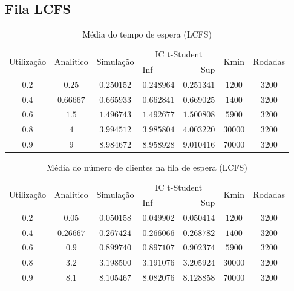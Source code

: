 \documentclass[a4paper]{article}
\begin{document}
\subsection{Fila LCFS}
\begin{table}[h!]
    \centering
    \begin{tabular}{|c|c|c|lr|c|c|}\hline
        \multirow{2}{4.35em}{Utilização}
            & \multirow{2}{3.95em}{Analítico}
            & \multirow{2}{4.4em}{Simulação}
            & \multicolumn{2}{|c|}{IC t-Student}
            & \multirow{2}{2.4em}{Kmin}
            & \multirow{2}{3.75em}{Rodadas} \\
        &&& Inf & Sup &&\\\hline
        $ 0.2 $&$ 0.25 $&$ 0.250152 $&$ 0.248964 $&$ 0.251341 $&$
            1200 $&$ 3200 $\\\hline
        $ 0.4 $&$ 0.66667 $&$ 0.665933 $&$ 0.662841 $&$ 0.669025 $&$
            1400 $&$ 3200 $\\\hline
        $ 0.6 $&$ 1.5 $&$ 1.496743 $&$ 1.492677 $&$ 1.500808 $&$
            5900 $&$ 3200 $\\\hline
        $ 0.8 $&$ 4 $&$ 3.994512 $&$ 3.985804 $&$ 4.003220 $&$
            30000 $&$ 3200 $\\\hline
        $ 0.9 $&$ 9 $&$ 8.984672 $&$ 8.958928 $&$ 9.010416 $&$
            70000 $&$ 3200 $\\\hline
    \end{tabular}
    \caption{Média do tempo de espera (LCFS)}
\end{table}

\begin{table}[h!]
    \centering
    \begin{tabular}{|c|c|c|lr|c|c|}\hline
        \multirow{2}{4.35em}{Utilização}
            & \multirow{2}{3.95em}{Analítico}
            & \multirow{2}{4.4em}{Simulação}
            & \multicolumn{2}{|c|}{IC t-Student}
            & \multirow{2}{2.4em}{Kmin}
            & \multirow{2}{3.75em}{Rodadas} \\
        &&& Inf & Sup &&\\\hline
        $ 0.2 $&$ 0.05 $&$ 0.050158 $&$ 0.049902 $&$ 0.050414 $&$
            1200 $&$ 3200 $\\\hline
        $ 0.4 $&$ 0.26667 $&$ 0.267424 $&$ 0.266066 $&$ 0.268782 $&$
            1400 $&$ 3200 $\\\hline
        $ 0.6 $&$ 0.9 $&$ 0.899740 $&$ 0.897107 $&$ 0.902374 $&$
            5900 $&$ 3200 $\\\hline
        $ 0.8 $&$ 3.2 $&$ 3.198500 $&$ 3.191076 $&$ 3.205924 $&$
            30000 $&$ 3200 $\\\hline
        $ 0.9 $&$ 8.1 $&$ 8.105467 $&$ 8.082076 $&$ 8.128858 $&$
            70000 $&$ 3200 $\\\hline
    \end{tabular}
    \caption{Média do número de clientes na fila de espera (LCFS)}
\end{table}
\end{document}
